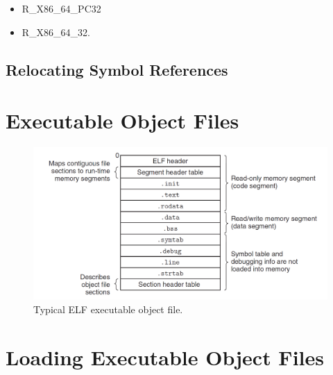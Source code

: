 \begin{itemize}
    \item R\_X86\_64\_PC32
    \item R\_X86\_64\_32.
\end{itemize}

\subsection{Relocating Symbol References}


\section{Executable Object Files}


\begin{figure}[h!]
    \centering
    \includegraphics[scale=0.4]{pic/section7/pic4.png}
    \caption{Typical ELF executable object file.}
\end{figure}

\section{Loading Executable Object Files}

